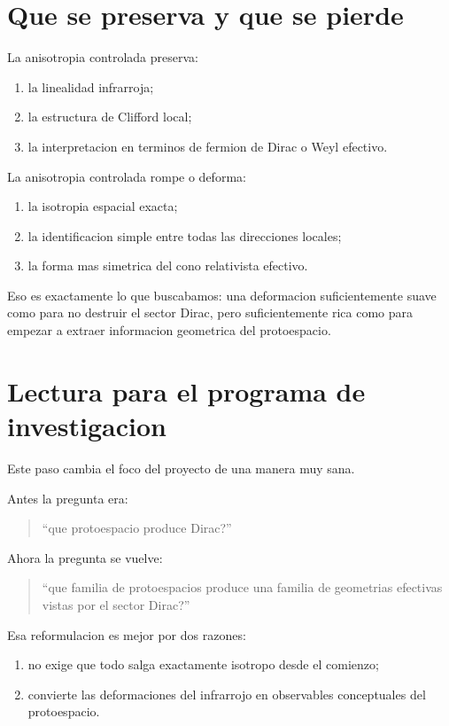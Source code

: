 \section{Que se preserva y que se pierde}
La anisotropia controlada preserva:
\begin{enumerate}[label=\arabic*.]
    \item la linealidad infrarroja;
    \item la estructura de Clifford local;
    \item la interpretacion en terminos de fermion de Dirac o Weyl efectivo.
\end{enumerate}

La anisotropia controlada rompe o deforma:
\begin{enumerate}[label=\arabic*.]
    \item la isotropia espacial exacta;
    \item la identificacion simple entre todas las direcciones locales;
    \item la forma mas simetrica del cono relativista efectivo.
\end{enumerate}

Eso es exactamente lo que buscabamos: una deformacion suficientemente suave como para no destruir el sector Dirac, pero suficientemente rica como para empezar a extraer informacion geometrica del protoespacio.

\section{Lectura para el programa de investigacion}
Este paso cambia el foco del proyecto de una manera muy sana.

Antes la pregunta era:
\begin{quote}
\enquote{que protoespacio produce Dirac?}
\end{quote}

Ahora la pregunta se vuelve:
\begin{quote}
\enquote{que familia de protoespacios produce una familia de geometrias efectivas vistas por el sector Dirac?}
\end{quote}

Esa reformulacion es mejor por dos razones:
\begin{enumerate}[label=\arabic*.]
    \item no exige que todo salga exactamente isotropo desde el comienzo;
    \item convierte las deformaciones del infrarrojo en observables conceptuales del protoespacio.
\end{enumerate}

